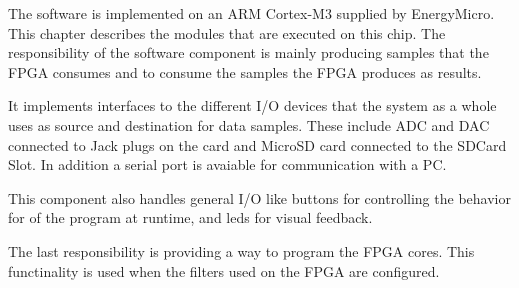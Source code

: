 The software is implemented on an ARM Cortex-M3 supplied by EnergyMicro. This
chapter describes the modules that are executed on this chip.
The responsibility of the software component is mainly producing samples that
the FPGA consumes and to consume the samples the FPGA produces as results.

It implements interfaces to the different I/O devices that the system as a whole
uses as source and destination for data samples. These include ADC and DAC
connected to Jack plugs on the card and MicroSD card connected to the SDCard
Slot. In addition a serial port is avaiable for communication with a PC. 

This component also handles general I/O like buttons for controlling the
behavior for of the program at runtime, and leds for visual feedback.

The last responsibility is providing a way to program the FPGA cores. This
functinality is used when the filters used on the FPGA are configured. 
